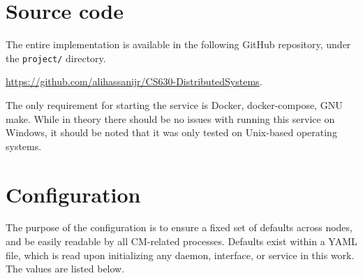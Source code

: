 \documentclass[sigconf]{acmart}
\begin{document}




\clearpage

\appendix

\section{Source code}
\label{supp:sourcecode}
The entire implementation is available in the following GitHub repository, under the \verb|project/| directory.

\noindent \url{https://github.com/alihassanijr/CS630-DistributedSystems}.

The only requirement for starting the service is Docker, docker-compose, GNU make.
While in theory there should be no issues with running this service on Windows, it should be noted that it was only tested on 
Unix-based operating systems.

\section{Configuration}
\label{supp:configuration}
The purpose of the configuration is to ensure a fixed set of defaults across nodes, and be easily readable by all CM-related
processes. Defaults exist within a YAML file, which is read upon initializing any daemon, interface, or service in this work.
The values are listed below.
\end{document}

